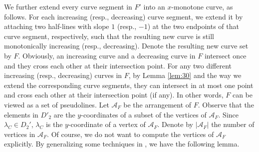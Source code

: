 \documentclass[11pt]{article}
\def\calA{\mathcal{A}}
\begin{document}
We further extend every curve segment in $F'$ into an $x$-monotone
curve, as follows. For each increasing (resp., decreasing) curve
segment, we extend it by attaching two half-lines with slope $1$
(resp., $-1$) at the two endpoints of that curve segment,
respectively, such that the resulting new curve is still monotonically increasing
(resp., decreasing). Denote the resulting new curve set by $F$. Obviously, an
increasing curve and a decreasing curve in $F$ intersect once and
they cross each other at their intersection point. For any two different increasing (resp.,
decreasing) curves in $F$, by Lemma \ref{lem:30} and the way we
extend the corresponding curve segments, they can intersect in at
most one point and cross each other at their intersection point
(if any). In other words, $F$ can be viewed as a set of pseudolines.
Let $\calA_F$ be the arrangement of $F$. Observe that the
elements in $D'_2$ are the $y$-coordinates of a subset of the
vertices of $\calA_F$. Since $\lambda_C\in D_2'$, $\lambda_C$ is the
$y$-coordinate of a vertex of $\calA_F$. Denote by $|\calA_F|$ the
number of vertices in $\calA_F$. Of course, we do not want to compute
the vertices of $\calA_F$ explicitly.  By generalizing some techniques in
\cite{ref:ColeAn89}, we have the following lemma.
\end{document}
